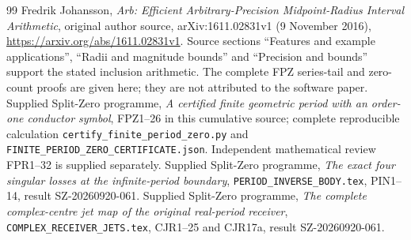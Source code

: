 \documentclass[11pt]{article}
\begin{document}
\begin{thebibliography}{99}
 Fredrik Johansson,
\emph{Arb: Efficient Arbitrary-Precision Midpoint-Radius Interval Arithmetic},
original author source, arXiv:1611.02831v1 (9 November 2016),
\url{https://arxiv.org/abs/1611.02831v1}.
Source sections ``Features and example applications'', ``Radii and
magnitude bounds'' and ``Precision and bounds'' support the stated
inclusion arithmetic. The complete FPZ series-tail and zero-count proofs
are given here; they are not attributed to the software paper.
 Supplied Split-Zero programme,
\emph{A certified finite geometric period with an order-one conductor symbol},
FPZ1--26 in this cumulative source; complete reproducible calculation
\texttt{certify\_finite\_period\_zero.py} and
\texttt{FINITE\_PERIOD\_ZERO\_CERTIFICATE.json}.
Independent mathematical review FPR1--32 is supplied separately.
 Supplied Split-Zero programme,
\emph{The exact four singular losses at the infinite-period boundary},
\texttt{PERIOD\_INVERSE\_BODY.tex}, PIN1--14, result SZ-20260920-061.
 Supplied Split-Zero programme,
\emph{The complete complex-centre jet map of the original real-period receiver},
\texttt{COMPLEX\_RECEIVER\_JETS.tex}, CJR1--25 and CJR17a,
result SZ-20260920-061.

\end{thebibliography}
\end{document}
